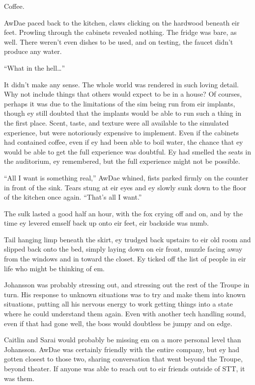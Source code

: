 Coffee.

AwDae paced back to the kitchen, claws clicking on the hardwood beneath eir feet. Prowling through the cabinets revealed nothing. The fridge was bare, as well. There weren't even dishes to be used, and on testing, the faucet didn't produce any water.

``What in the hell\ldots{}''

It didn't make any sense. The whole world was rendered in such loving detail. Why not include things that others would expect to be in a house? Of courses, perhaps it was due to the limitations of the sim being run from eir implants, though ey still doubted that the implants would be able to run such a thing in the first place. Scent, taste, and texture were all available to the simulated experience, but were notoriously expensive to implement. Even if the cabinets had contained coffee, even if ey had been able to boil water, the chance that ey would be able to get the full experience was doubtful. Ey had smelled the seats in the auditorium, ey remembered, but the full experience might not be possible.

``All I want is something real,'' AwDae whined, fists parked firmly on the counter in front of the sink. Tears stung at eir eyes and ey slowly sunk down to the floor of the kitchen once again. ``That's all I want.''

The sulk lasted a good half an hour, with the fox crying off and on, and by the time ey levered emself back up onto eir feet, eir backside was numb.

Tail hanging limp beneath the skirt, ey trudged back upstairs to eir old room and slipped back onto the bed, simply laying down on eir front, muzzle facing away from the windows and in toward the closet. Ey ticked off the list of people in eir life who might be thinking of em.

Johansson was probably stressing out, and stressing out the rest of the Troupe in turn. His response to unknown situations was to try and make them into known situations, putting all his nervous energy to work getting things into a state where he could understand them again. Even with another tech handling sound, even if that had gone well, the boss would doubtless be jumpy and on edge.

Caitlin and Sarai would probably be missing em on a more personal level than Johansson. AwDae was certainly friendly with the entire company, but ey had gotten closest to those two, sharing conversation that went beyond the Troupe, beyond theater. If anyone was able to reach out to eir friends outside of STT, it was them.

